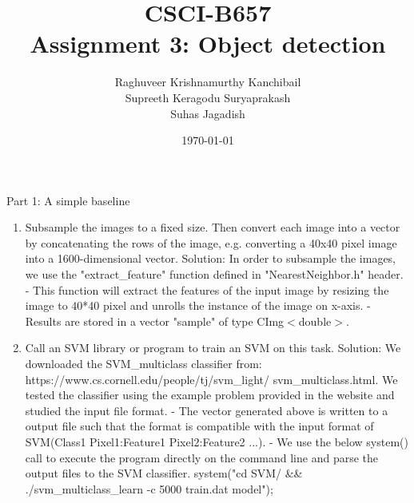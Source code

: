 \documentclass{article}
\begin{document}
\title{CSCI-B657 \\Assignment 3: Object detection}         %
	\author{Raghuveer Krishnamurthy Kanchibail\\ Supreeth Keragodu Suryaprakash \\ Suhas Jagadish \\ }        %
	\date{\today}          %
	\maketitle
	
	\makeatother
	
	\pagestyle{plain}
	
	Part 1: A simple baseline
	\begin{enumerate}
		\item Subsample the images to a fixed size. Then convert each image into a vector by concatenating the rows of the image, e.g. converting a 40x40 pixel image into a 1600-dimensional vector. \newline \newline
		Solution: In order to subsample the images, we use the "extract\_feature" function defined in "NearestNeighbor.h" header. \newline
		- This function will extract the features of the input image by resizing the image to 40*40 pixel and unrolls the instance of the image on x-axis. \newline
		- Results are stored in a vector "sample" of type CImg$<$double$>$. \newline
		
		\item Call an SVM library or program to train an SVM on this task. \newline \newline
		Solution: We downloaded the SVM\_multiclass classifier from: https://www.cs.cornell.edu/people/tj/svm\_light/
		svm\_multiclass.html. We tested the classifier using the example problem provided in the website and studied the input file format. \newline
		- The vector generated above is written to a output file such that the format is compatible with the input format of SVM(Class1 Pixel1:Feature1 Pixel2:Feature2 ...). \newline
		- We use the below system() call to execute the program directly on the command line and parse the output files to the SVM classifier. \newline \newline
		system("cd SVM/ \&\& ./svm\_multiclass\_learn -c 5000 train.dat model"); \newline
		

\end{enumerate}
\end{document}
